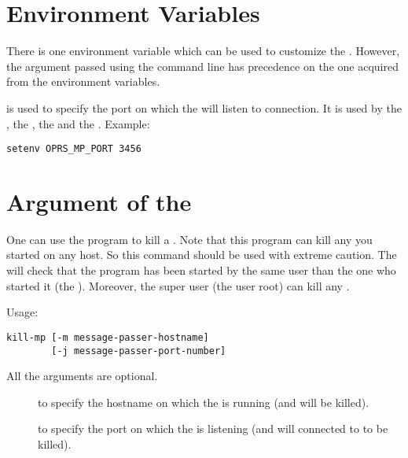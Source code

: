 \section{\MPA{} Environment Variables}

There is one environment variable which can be used to customize the \MPA{}.
However, the argument passed using the command line has precedence on the one
acquired from the environment variables.

\begin{description}

\item[\code{OPRS\_MP\_PORT}] is used  to specify the port on which the \MPA{} will
listen to connection. It is used by the \CPK{}, the \XPK{}, the \OPRSS{}
and the \MPA{}.\*
Example:
\begin{verbatim}
setenv OPRS_MP_PORT 3456
\end{verbatim}

\end{description}

\section{Argument of the \MPK{}}

One can use the  program to kill a \MPA{}. Note that this program
can kill any \MPA{} you started on any host. So this command should be used with
extreme caution. The \MPA{} will check that the \MPK{} program has been started
by the same user than the one who started it (the \MPA{}). Moreover, the super
user (the user root) can kill any \MPA{}.  

Usage: \begin{verbatim}
kill-mp [-m message-passer-hostname]
        [-j message-passer-port-number]       

\end{verbatim}

All the arguments are optional.

\begin{description}

\item[] to specify the hostname on which the \MPA{} is running (and will
be killed).

\item[] to specify the port on which the \MPA{} is listening (and will
connected to to be killed).

\end{description}

